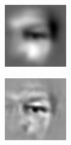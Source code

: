 \documentclass{article}
\begin{document}
\begin{figure}[h!]
\begin{subfigure}[b]{0.1\textwidth}
    \end{subfigure}
    \hspace{-1\baselineskip}
    \quad
    \begin{subfigure}[b]{0.1\textwidth}   
        \centering 
        \includegraphics[width=\textwidth]{plots/D_lin_R2_template.jpg}

    \end{subfigure}
    \hspace{-1\baselineskip}
    \quad
    \begin{subfigure}[b]{0.1\textwidth}   
        \centering 
        \includegraphics[width=\textwidth]{plots/E_lin_R2_template.jpg}


\end{subfigure}
\end{figure}
\end{document}
